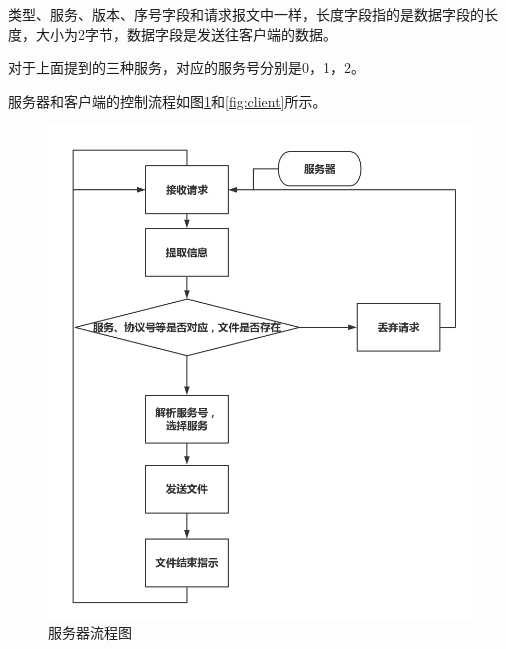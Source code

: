 \documentclass[15pt]{ctexart}
\begin{document}
	    	\par 类型、服务、版本、序号字段和请求报文中一样，长度字段指的是数据字段的长度，大小为2字节，数据字段是发送往客户端的数据。
	    	\par 对于上面提到的三种服务，对应的服务号分别是0，1，2。
	    	\par 服务器和客户端的控制流程如图\ref{fig:server}和\ref{fig:client}所示。
	    	\begin{figure}[H]
	    		\begin{minipage}{0.5\linewidth}
		    		\flushleft
		    		\includegraphics[width=1.1\linewidth]{imgs/server.png}
		    		\caption{服务器流程图}
		    		\label{fig:server}
	    		\end{minipage}
	    		\begin{minipage}{0.45\linewidth}
		    		\flushright

\end{minipage}
\end{figure}
\end{document}
